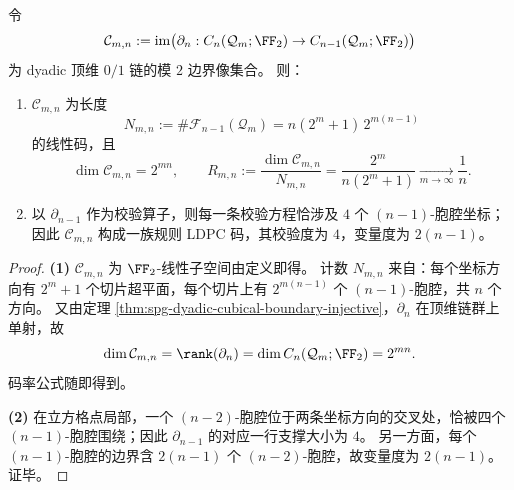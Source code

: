 \begin{theorem}\label{thm:spg-dyadic-boundary-image-ldpc}
令
\[
\mathcal C_{m,n}:=\mathrm{im}\bigl(\partial_n:C_n(\mathcal Q_m;\FF_2)\to C_{n-1}(\mathcal Q_m;\FF_2)\bigr)
\]
为 dyadic 顶维 \(0/1\) 链的模 \(2\) 边界像集合。
则：
\begin{enumerate}
  \item \(\mathcal C_{m,n}\) 为长度
        \[
        N_{m,n}:=\#\mathcal F_{n-1}(\mathcal Q_m)=n(2^m+1)\,2^{m(n-1)}
        \]
        的线性码，且
        \[
        \dim \mathcal C_{m,n}=2^{mn},
        \qquad
        R_{m,n}:=\frac{\dim \mathcal C_{m,n}}{N_{m,n}}
        =\frac{2^m}{n(2^m+1)}\xrightarrow[m\to\infty]{}\frac1n.
        \]
  \item 以 \(\partial_{n-1}\) 作为校验算子，则每一条校验方程恰涉及 \(4\) 个 \((n-1)\)-胞腔坐标；因此 \(\mathcal C_{m,n}\) 构成一族规则 LDPC 码，其校验度为 \(4\)，变量度为 \(2(n-1)\)。
\end{enumerate}
\end{theorem}
\begin{proof}
\textbf{(1)}
\(\mathcal C_{m,n}\) 为 \(\FF_2\)-线性子空间由定义即得。
计数 \(N_{m,n}\) 来自：每个坐标方向有 \(2^m+1\) 个切片超平面，每个切片上有 \(2^{m(n-1)}\) 个 \((n-1)\)-胞腔，共 \(n\) 个方向。
又由定理 \ref{thm:spg-dyadic-cubical-boundary-injective}，\(\partial_n\) 在顶维链群上单射，故
\[
\dim \mathcal C_{m,n}=\rank(\partial_n)=\dim C_n(\mathcal Q_m;\FF_2)=2^{mn}.
\]
码率公式随即得到。
\par
\textbf{(2)}
在立方格点局部，一个 \((n-2)\)-胞腔位于两条坐标方向的交叉处，恰被四个 \((n-1)\)-胞腔围绕；因此 \(\partial_{n-1}\) 的对应一行支撑大小为 \(4\)。
另一方面，每个 \((n-1)\)-胞腔的边界含 \(2(n-1)\) 个 \((n-2)\)-胞腔，故变量度为 \(2(n-1)\)。证毕。
\end{proof}

